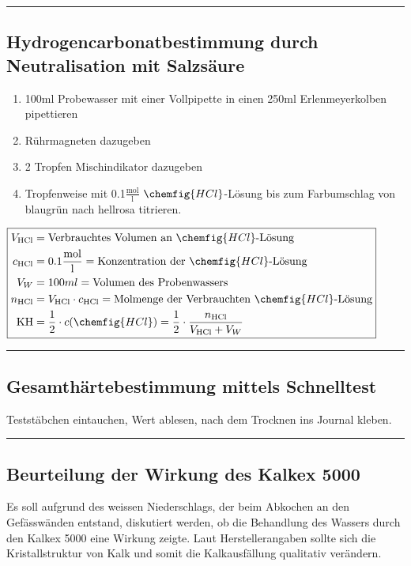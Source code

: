 \rule{\linewidth}{0.5mm}
\subsection{Hydrogencarbonatbestimmung durch Neutralisation mit Salzsäure}
\begin{addmargin}[3cm]{0cm}
		\begin{enumerate}
			\item 100ml Probewasser mit einer Vollpipette in einen 250ml Erlenmeyerkolben pipettieren
		
			\item Rührmagneten dazugeben
			
			\item 2 Tropfen Mischindikator dazugeben
			
			\item Tropfenweise mit 0.1$\frac{\mathrm{mol}}{\mathrm{l}}$ $\chemfig{HCl}$-Lösung bis zum Farbumschlag von blaugrün nach hellrosa titrieren.
		\end{enumerate}
		
		\vspace{0.5cm}
		$\boxed
		{
			\begin{aligned}
				V_{\mathrm{HCl}} &= \text{Verbrauchtes Volumen an } \chemfig{HCl} \text{-Lösung} \\
				c_{\mathrm{HCl}} &= 0.1 \frac{\mathrm{mol}}{\mathrm{l}}= \text{Konzentration der } \chemfig{HCl} \text{-Lösung} \\
				V_{W} &= 100ml = \text{Volumen des Probenwassers} \\
				n_{\mathrm{HCl}} &= V_{\mathrm{HCl}}\cdot c_{\mathrm{HCl}} =\text{Molmenge der Verbrauchten } \chemfig{HCl} \text{-Lösung} \\
				\mathrm{KH} &=   \frac{1}{2}\cdot c(\chemfig{HCl}) = \frac{1}{2}\cdot \frac{n_{\mathrm{HCl}}}{V_{\mathrm{HCl}}+V_{W}} 
			\end{aligned}
		}$
		
		\vspace{0.5cm}
\end{addmargin}


\rule{\linewidth}{0.5mm}
\subsection{Gesamthärtebestimmung mittels Schnelltest}
\begin{addmargin}[3cm]{0cm}
		Teststäbchen eintauchen, Wert ablesen, nach dem Trocknen ins Journal kleben.
\end{addmargin}

\rule{\linewidth}{0.5mm}
\subsection{Beurteilung der Wirkung des Kalkex 5000}
\begin{addmargin}[3cm]{0cm}
		Es soll aufgrund des weissen Niederschlags, der beim Abkochen an den Gefässwänden entstand, diskutiert werden, ob die Behandlung des Wassers durch den Kalkex 5000 eine Wirkung zeigte. Laut Herstellerangaben sollte sich die Kristallstruktur von Kalk und somit die Kalkausfällung qualitativ verändern.
\end{addmargin}
